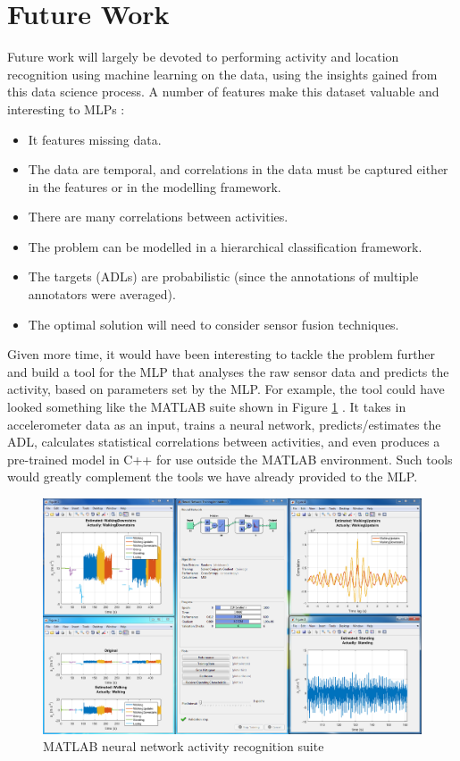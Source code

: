 \documentclass[fleqn,10pt]{SelfArx} %
\begin{document}
\section{Future Work}
Future work will largely be devoted to performing activity and location recognition using machine learning on the data, using the insights gained from this data science process. A number of features make this dataset valuable and interesting to MLPs \cite{sphere2017}: 
\begin{itemize}
\item It features missing data.
\item The data are temporal, and correlations in the data must be captured either in the features or in the modelling framework. 
\item There are many correlations between activities. 
\item The problem can be modelled in a hierarchical classification framework. 
\item The targets (ADLs) are probabilistic (since the annotations of multiple annotators were averaged). 
\item The optimal solution will need to consider sensor fusion techniques.
\end{itemize}
Given more time, it would have been interesting to tackle the problem further and build a tool for the MLP that analyses the raw sensor data and predicts the activity, based on parameters set by the MLP. For example, the tool could have looked something like the MATLAB suite shown in Figure \ref{fig:full_screen} \cite{Mathworks2015}. It takes in accelerometer data as an input, trains a neural network, predicts/estimates the ADL, calculates statistical correlations between activities, and even produces a pre-trained model in C++ for use outside the MATLAB environment. Such tools would greatly complement the tools we have already provided to the MLP. \\

\begin{figure}[!h] \centering
	\includegraphics[scale=0.4]{full_screen} 
	\caption{MATLAB neural network activity recognition suite \cite{Mathworks2015}}
	\label{fig:full_screen}
\end{figure}
\end{document}
